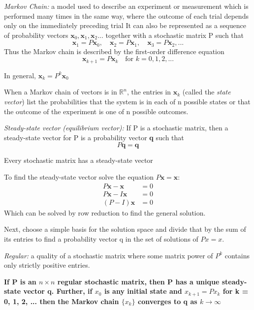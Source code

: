 \documentclass[12pt]{article} %
\newcommand{\R}{\mathbb{R}}
\begin{document}
\emph{Markov Chain:} a model used to describe an experiment or measurement which is performed many times in the same way, where the outcome of each trial depends only on the immediately preceding trial
It can also be represented as a sequence of probability vectors $\mathbf{x}_0, \mathbf{x}_1, \mathbf{x}_2...$ together with a stochastic matrix P such that 
$$\mathbf{x}_1 = P\mathbf{x}_0, \quad  \mathbf{x}_2 = P\mathbf{x}_1, \quad  \mathbf{x}_3 = P\mathbf{x}_2, ...$$
Thus the Markov chain is described by the first-order difference equation
$$\mathbf{x}_{k + 1} = P\mathbf{x}_k \quad \text{for } k = 0, 1, 2, ...$$

In general, $\mathbf{x}_k = P^k \mathbf{x}_0$

When a Markov chain of vectors is in $\R^n$, the entries in $\mathbf{x}_k$ (called the \emph{state vector}) list the probabilities that the system is in each of n possible states or that the outcome of the experiment is one of n possible outcomes. 

\emph{Steady-state vector (equilibrium vector):} If P is a stochastic matrix, then a steady-state vector for P is a probability vector \textbf{q} such that 
$$P\mathbf{q} = \mathbf{q}$$

Every stochastic matrix has a steady-state vector

To find the steady-state vector solve the equation $P\mathbf{x} = \mathbf{x}$:
\begin{align*}
	P\mathbf{x} - \mathbf{x} &= 0\\
	P\mathbf{x} - I\mathbf{x} &= 0\\
	(P - I)\mathbf{x} &= 0
\end{align*}
Which can be solved by row reduction to find the general solution. 

Next, choose a simple basis for the solution space and divide that by the sum of its entries to find a probability vector q in the set of solutions of $Px = x$. 

\emph{Regular:} a quality of a stochastic matrix where some matrix power of $P^k$ contains only strictly positive entries. 

\textbf{If P is an $n \times n$ regular stochastic matrix, then P has a unique steady-state vector q. Further, if $x_0$ is any initial state and $x_{k + 1} = Px_k$ for k = 0, 1, 2, ... then the Markov chain $\{x_k\}$ converges to q as $k \rightarrow \infty$}

\end{document}

